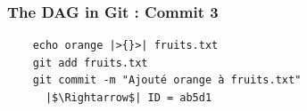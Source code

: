 \documentclass[table,tikz,12pt,svgnames]{beamer}
\begin{document}
\begin{frame}[fragile]
\frametitle{The DAG in Git : Commit 3}

	\begin{figure}
		\begin{subfigure}[h]{\textwidth}
		\end{subfigure}
	\end{figure}

\begin{block}{}%
	\vspace{0.4cm} \begin{center} \noindent{} \end{center} \vspace{-0.4cm} 		
	\begin{verbatim}
	echo orange |>{}>| fruits.txt
	git add fruits.txt
	git commit -m "Ajouté orange à fruits.txt"
	  |$\Rightarrow$| ID = ab5d1
	\end{verbatim}
\end{block}
\end{frame}
\end{document}
